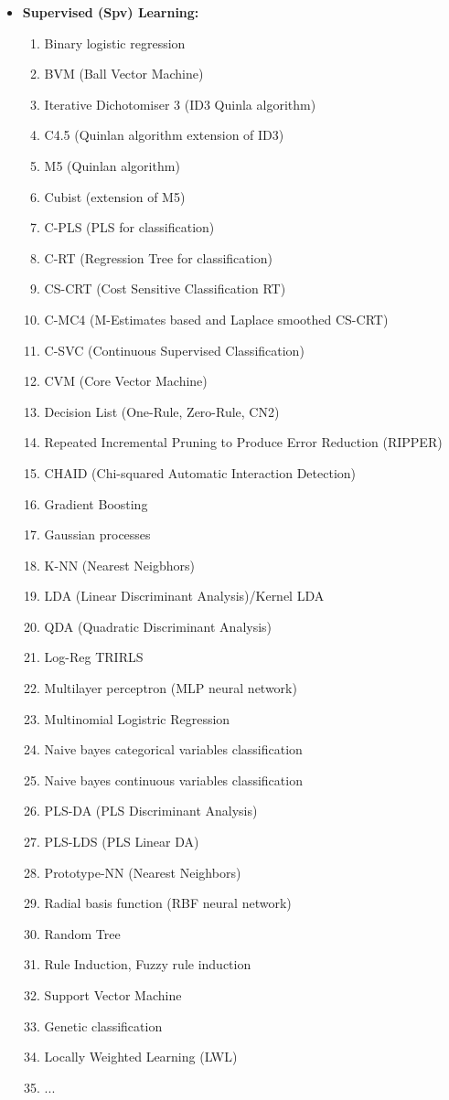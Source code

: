 \begin{itemize}
		\item \textbf{Supervised (Spv) Learning:}
		\begin{multicols}{2}
		\begin{enumerate}
			\item Binary logistic regression
			\item BVM (Ball Vector Machine)
			\item Iterative Dichotomiser 3 (ID3 Quinla algorithm)
			\item C4.5 (Quinlan algorithm extension of ID3)
			\item M5 (Quinlan algorithm)
			\item Cubist (extension of M5)
			\item C-PLS (PLS for classification)
			\item C-RT (Regression Tree for classification)
			\item CS-CRT (Cost Sensitive Classification RT)
			\item C-MC4 (M-Estimates based and Laplace smoothed CS-CRT)
			\item C-SVC (Continuous Supervised Classification)
			\item CVM (Core Vector Machine)
			\item Decision List (One-Rule, Zero-Rule, CN2)
			\item Repeated Incremental Pruning to Produce Error Reduction (RIPPER) 
			\item CHAID (Chi-squared Automatic Interaction Detection)
			\item Gradient Boosting
			\item Gaussian processes
			\item K-NN (Nearest Neigbhors)
			\item LDA (Linear Discriminant Analysis)/Kernel LDA
			\item QDA (Quadratic Discriminant Analysis)
			\item Log-Reg TRIRLS 
			\item Multilayer perceptron (MLP neural network)
			\item Multinomial Logistric Regression
			\item Naive bayes categorical variables classification
			\item Naive bayes continuous variables classification
			\item PLS-DA (PLS Discriminant Analysis)
			\item PLS-LDS (PLS Linear DA)
			\item Prototype-NN (Nearest Neighbors)
			\item Radial basis function (RBF neural network)
			\item Random Tree
			\item Rule Induction, Fuzzy rule induction
			\item Support Vector Machine
			\item Genetic classification
			\item Locally Weighted Learning (LWL)
			\item ...
		\end{enumerate}
		\end{multicols}
		

\end{itemize}
